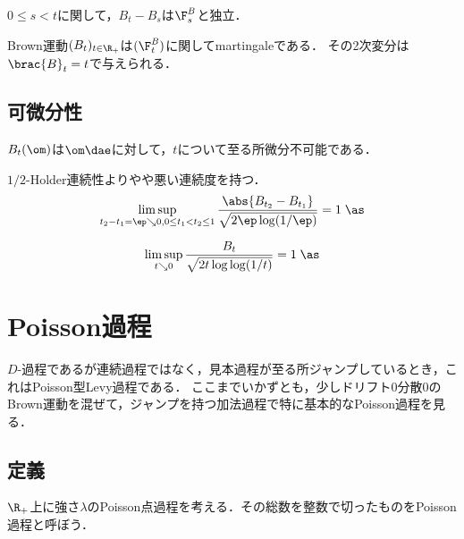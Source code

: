 \documentclass[uplatex,dvipdfmx]{jsreport}
\begin{document}
\begin{proposition}
    $0\le s<t$に関して，$B_t-B_s$は$\F_s^B$と独立．
\end{proposition}

\begin{corollary}
    Brown運動$(B_t)_{t\in\R_+}$は$(\F^B_t)$に関してmartingaleである．
    その2次変分は$\brac{B}_t=t$で与えられる．
\end{corollary}

\subsection{可微分性}

\begin{theorem}
    $B_t(\om)$は$\om\dae$に対して，$t$について至る所微分不可能である．
\end{theorem}

\begin{theorem}
    $1/2$-Holder連続性よりやや悪い連続度を持つ．
    \[\limsup_{t_2-t_1=\ep\searrow0,0\le t_1<t_2\le1}\frac{\abs{B_{t_2}-B_{t_1}}}{\sqrt{2\ep\log(1/\ep)}}=1\;\as\]
\end{theorem}

\begin{theorem}[重複対数の法則]
    \[\limsup_{t\searrow0}\frac{B_t}{\sqrt{2t\log\log(1/t)}}=1\;\as\]
\end{theorem}

\section{Poisson過程}

\begin{tcolorbox}[colframe=ForestGreen, colback=ForestGreen!10!white,breakable,colbacktitle=ForestGreen!40!white,coltitle=black,fonttitle=\bfseries\sffamily,
title=]
    $D$-過程であるが連続過程ではなく，見本過程が至る所ジャンプしているとき，これはPoisson型Levy過程である．
    ここまでいかずとも，少しドリフト$0$分散$0$のBrown運動を混ぜて，ジャンプを持つ加法過程で特に基本的なPoisson過程を見る．
\end{tcolorbox}

\subsection{定義}

\begin{tcolorbox}[colframe=ForestGreen, colback=ForestGreen!10!white,breakable,colbacktitle=ForestGreen!40!white,coltitle=black,fonttitle=\bfseries\sffamily,
title=]
    $\R_+$上に強さ$\lambda$のPoisson点過程を考える．その総数を整数で切ったものをPoisson過程と呼ぼう．
\end{tcolorbox}
\end{document}
